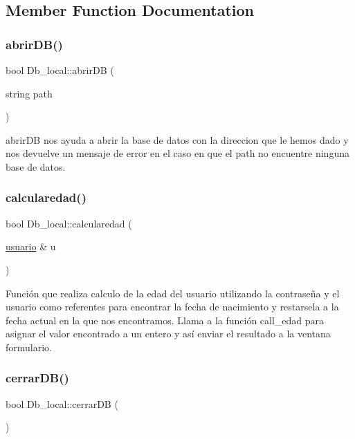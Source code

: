 \subsection{Member Function Documentation}
\mbox{\label{class_db__local_ab36977bb84cdf4484db434e9d84403c6}} 
\subsubsection{\texorpdfstring{abrir\+D\+B()}{abrirDB()}}
{\footnotesize\ttfamily bool Db\+\_\+local\+::abrir\+DB (\begin{DoxyParamCaption}\item[{string}]{path }\end{DoxyParamCaption})}

abrir\+DB nos ayuda a abrir la base de datos con la direccion que le hemos dado y nos devuelve un mensaje de error en el caso en que el path no encuentre ninguna base de datos. \mbox{\label{class_db__local_aae39c7614d35aadf4e575368b078364f}} 
\subsubsection{\texorpdfstring{calcularedad()}{calcularedad()}}
{\footnotesize\ttfamily bool Db\+\_\+local\+::calcularedad (\begin{DoxyParamCaption}\item[{\hyperlink{classusuario}{usuario} \&}]{u }\end{DoxyParamCaption})}

Función que realiza calculo de la edad del usuario utilizando la contraseña y el usuario como referentes para encontrar la fecha de nacimiento y restarsela a la fecha actual en la que nos encontramos. Llama a la función call\+\_\+edad para asignar el valor encontrado a un entero y así enviar el resultado a la ventana formulario. \mbox{\label{class_db__local_adb458d3fdb74eeb44ff839b6b8425343}} 
\subsubsection{\texorpdfstring{cerrar\+D\+B()}{cerrarDB()}}
{\footnotesize\ttfamily bool Db\+\_\+local\+::cerrar\+DB (\begin{DoxyParamCaption}{ }\end{DoxyParamCaption})}

